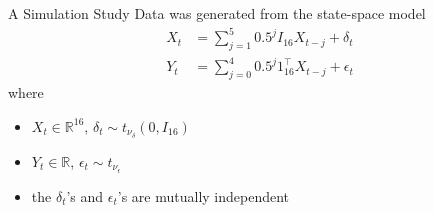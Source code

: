 \documentclass{beamer}
\newtheorem{remark}{Remark}[section]
\def\R{\mathbb R}
\begin{document}


\begin{frame}{A Simulation Study}
    Data was generated from the state-space model
    \begin{align*}
        X_t &= \sum_{j = 1}^5 0.5^j I_{16}X_{t - j} + \delta_t \\
        Y_t &= \sum_{j = 0}^4 0.5^j 1_{16}^{\top}X_{t - j} + \epsilon_t
    \end{align*}
    where
    \begin{itemize}
        \item $X_t \in \R^{16}$, $\delta_t \sim t_{\nu_{\delta}}(0, I_{16})$
        \item $Y_t \in \R$, $\epsilon_t \sim t_{\nu_{\epsilon}}$
        \item the $\delta_t$'s and $\epsilon_t$'s are mutually independent
    \end{itemize}
\end{frame}
\end{document}
